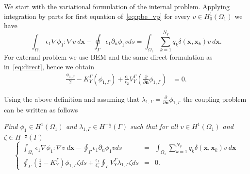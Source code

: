 \begin{itemize}
    We start with the variational formulation of the internal problem. Applying integration by parts for first equation of~\eqref{eq:pbe_vp} for every $v \in H_0^1(\Omega_1)$ we have
\begin{equation}
\label{eq:fem}
 \int_{\Omega_1} \epsilon_1 \nabla \phi_1 : \nabla v ~d\mathbf{x}  - \oint_\Gamma \epsilon_1\partial_n \phi_1 v ds =   \int_{\Omega_1}  \sum_{k=1}^{N_q} q_k\delta(\mathbf{x},\mathbf{x}_k)  v ~d\mathbf{x}.
\end{equation}
For external problem we use BEM and the same direct formulation as in~\eqref{eq:direct}, hence we obtain
\begin{align*}
\frac{\phi_{1,\Gamma}}{2} - K_{Y}^{\Gamma}(\phi_{1,\Gamma}) + \frac{\epsilon_1}{\epsilon_2}V_{Y}^{\Gamma} \left( \frac{\partial}{\partial \mathbf{n}} \phi_{1,\Gamma} \right) & = 0.
\end{align*}

Using the above definition and assuming that $\lambda_{1,\Gamma}  = \frac{\partial}{\partial \mathbf{n}} \phi_{1,\Gamma} $ the coupling problem can be written as follows
\begin{center}
  \textit{Find $ \phi_1 \in H^1(\Omega_1)$ and $\lambda_{1,\Gamma} \in H^{-\frac{1}{2}}(\Gamma)$ such that for all $v \in H^1(\Omega_1)$ and $\zeta \in H^{-\frac{1}{2}}(\Gamma)$}
\begin{equation} 
\label{eq:standard_fem_bem}
 \left\{
 \begin{array}{rcl}
 \int_{\Omega_1} \epsilon_1 \nabla \phi_1 : \nabla v ~d\mathbf{x}  - \oint_\Gamma \epsilon_1\partial_n \phi_1 v ds &=&   \int_{\Omega_1}  \sum_{k=1}^{N_q} q_k\delta(\mathbf{x},\mathbf{x}_k)  v ~d\mathbf{x} \\[3mm] 
  \oint_\Gamma \left(\tfrac{1}{2} - K_{Y}^{\Gamma}\right) \phi_{1,\Gamma} \zeta ds + \frac{\epsilon_1}{\epsilon_2} \oint_\Gamma V_{Y}^{\Gamma} \lambda_{1,\Gamma} \zeta ds &=&0.
  \end{array}
  \right.
\end{equation}
\end{center}





\end{itemize}
